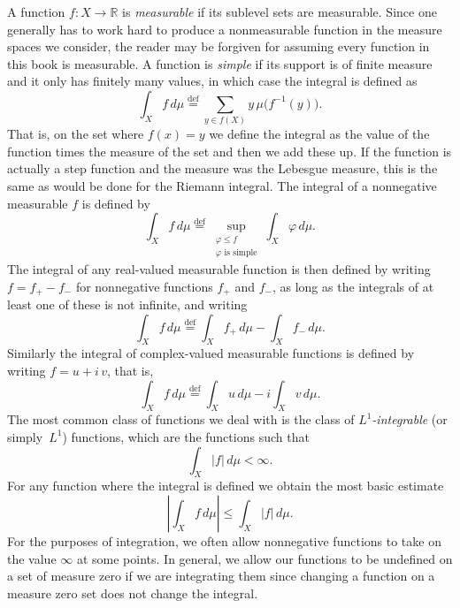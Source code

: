 \documentclass[12pt,openany]{book}
\newcommand{\sabs}[1]{\lvert {#1} \rvert}
\newcommand{\abs}[1]{\left\lvert {#1} \right\rvert}
\newcommand{\R}{{\mathbb{R}}}
\newcommand{\myindex}[1]{#1\index{#1}}
\theoremstyle{plain}
\theoremstyle{remark}
\theoremstyle{definition}
\theoremstyle{exercise}
\theoremstyle{example}
\begin{document}
A function $f \colon X \to \R$ is
\emph{measurable} if its sublevel
sets are measurable.
Since one generally has to work hard to produce a
\myindex{nonmeasurable function}
in the measure spaces we consider,
the reader may be forgiven for assuming every function in
this book is measurable.
A function is
\emph{simple}
if its support is of finite
measure and it only has finitely many values, in which case the integral is
defined as
\begin{equation*}
\int_X f\, d \mu
\overset{\text{def}}{=}
\sum_{y \in f(X)}
y \, \mu\bigl(f^{-1}(y)\bigr) .
\end{equation*}
That is, on the set where $f(x)=y$ we define the integral as the value of
the function times the measure of the set and then we add these up.
If the function is actually a step function and the measure was the Lebesgue
measure, this is the same as would be done for the Riemann integral.
The integral of a nonnegative measurable $f$ is defined by
\begin{equation*}
\int_X f\, d \mu
\overset{\text{def}}{=}
\sup_{\substack{\varphi \leq f \\ \varphi \text{ is simple}}}
\int_X \varphi \, d\mu .
\end{equation*}
The integral of any real-valued measurable function is
then defined by writing $f = f_+ - f_-$ for
nonnegative functions $f_+$ and $f_-$, as long as
the integrals of at least one of these is not infinite, and writing
\begin{equation*}
\int_X f\, d \mu
\overset{\text{def}}{=}
\int_X f_+\, d \mu
-
\int_X f_-\, d \mu .
\end{equation*}
Similarly the integral of
complex-valued measurable functions is defined by writing $f = u + i \, v$,
that is,
\begin{equation*}
\int_X f\, d \mu
\overset{\text{def}}{=}
\int_X u\, d \mu
-
i
\int_X v\, d \mu .
\end{equation*}
The most common class of functions we deal with is the class of
\emph{$L^1$-integrable}
(or simply~$L^1$)
functions, which are the functions such that
\begin{equation*}
\int_X \sabs{f} \, d\mu < \infty .
\end{equation*}
For any function where the integral is defined we obtain
the most basic estimate
\begin{equation*}
\abs{\int_X f \, d\mu} \leq
\int_X \sabs{f} \, d\mu .
\end{equation*}
For the purposes of integration, we often allow nonnegative
functions to take on the value $\infty$ at some points.
In general, we allow our functions to
be undefined on a set of measure zero if we are integrating them since
changing a function on a measure zero set does not change the integral.
\end{document}
